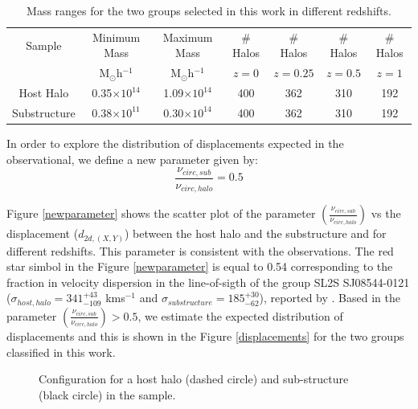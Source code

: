 \documentclass{emulateapj}
\begin{document}
\begin{table}
\begin{center}
\begin{tabular}{ccccccc}\hline\hline
Sample       & Minimum Mass           & Maximum Mass          & \# Halos  & \# Halos  & \# Halos & \# Halos \\
             & M$_{\odot}$h$^{-1}$    & M$_{\odot}$h$^{-1}$   &   $z=0$   & $z=0.25$  & $z=0.5$  & $z=1$  \\\hline
Host Halo    & 0.35$\times{}10^{14}$  & 1.09$\times{}10^{14}$ &    400    &   362     &   310    &  192   \\
Substructure & 0.38$\times{}10^{11}$  & 0.30$\times{}10^{14}$ &    400    &   362     &   310    &  192   \\\hline
\end{tabular} 
\caption{Mass ranges for the two groups selected in this work in different redshifts.}
\label{table1}
\end{center}
\end{table}


In order to explore the distribution of displacements expected in the observational, we define a new parameter given by:\\

\begin{equation}
 \frac{\nu_{circ,sub}}{\nu_{circ,halo}}=0.5
\end{equation}
 

Figure \ref{newparameter} shows the scatter plot of the parameter $\left(\frac{\nu_{circ,sub}}{\nu_{circ,halo}}\right)$ vs the 
displacement ($d_{2d,(X,Y)}$) between the host halo and the substructure and for different redshifts. This parameter is 
consistent with the observations. The red star simbol in the Figure \ref{newparameter} is equal to 0.54 corresponding to 
the fraction in velocity dispersion in the line-of-sigth of the group SL2S SJ08544-0121 ($\sigma_{host,halo}=341^{+43}_{-109}$ kms$^{-1}$ and $\sigma_{substructure}=185^{+30}_{-62}$), reported by \citet{2013A&A...552A..80M}.
Based in the parameter $\left(\frac{\nu_{circ,sub}}{\nu_{circ,halo}}\right)>0.5$, we estimate the expected distribution of
displacements and this is shown in the Figure \ref{displacements} for the two groups classified in this work.
 
  
\begin{figure}
\begin{center}
\end{center}
\caption{Configuration for a host halo (dashed circle) and sub-structure (black circle) in the sample. } 
\label{configuration}
\end{figure}
\end{document}
